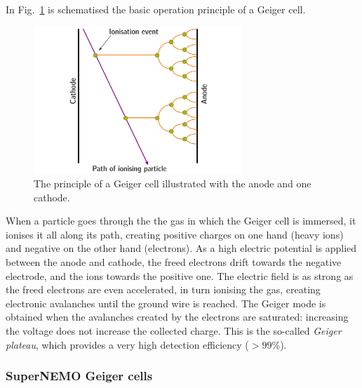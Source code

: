 In Fig.~\ref{fig:geiger_avalanche} is schematised the basic operation principle of a Geiger cell.
\begin{figure}[h!]
\centering
\includegraphics[width=0.7\textwidth]{SNdemonstrator/fig_SNdemonstrator/geiger_avalanche.pdf}
\caption{The principle of a Geiger cell illustrated with the anode and one cathode.
\label{fig:geiger_avalanche}}
\end{figure}
When a particle goes through the the gas in which the Geiger cell is immersed, it ionises it all along its path, creating positive charges on one hand (heavy ions) and negative on the other hand (electrons).
As a high electric potential is applied between the anode and cathode, the freed electrons drift towards the negative electrode, and the ions towards the positive one.
The electric field is as strong as the freed electrons are even accelerated, in turn ionising the gas, creating electronic avalanches until the ground wire is reached.
The Geiger mode is obtained when the avalanches created by the electrons are saturated: increasing the voltage does not increase the collected charge.
This is the so-called \emph{Geiger plateau}, which provides a very high detection efficiency ($>99$\%).


\subsubsection*{SuperNEMO Geiger cells}

